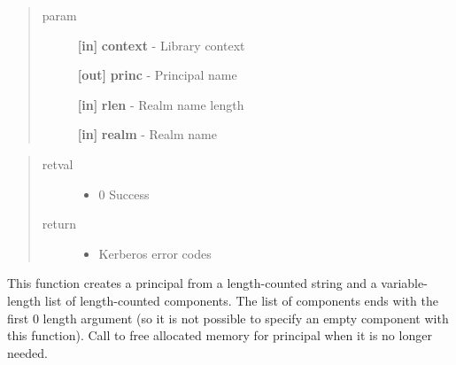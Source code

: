 \documentclass[letterpaper,10pt,english]{sphinxmanual}
\begin{document}
\begin{fulllineitems}
\label{appdev/refs/api/krb5_build_principal_ext:c.krb5_build_principal_ext}
\end{fulllineitems}

\begin{quote}\begin{description}
\item[{param}] \leavevmode
\textbf{{[}in{]}} \textbf{context} - Library context

\textbf{{[}out{]}} \textbf{princ} - Principal name

\textbf{{[}in{]}} \textbf{rlen} - Realm name length

\textbf{{[}in{]}} \textbf{realm} - Realm name

\end{description}\end{quote}
\begin{quote}\begin{description}
\item[{retval}] \leavevmode\begin{itemize}
\item {} 
0   Success

\end{itemize}

\item[{return}] \leavevmode\begin{itemize}
\item {} 
Kerberos error codes

\end{itemize}

\end{description}\end{quote}

This function creates a principal from a length-counted string and a variable-length list of length-counted components. The list of components ends with the first 0 length argument (so it is not possible to specify an empty component with this function). Call {\hyperref[appdev/refs/api/krb5_free_principal:c.krb5_free_principal]{}} to free allocated memory for principal when it is no longer needed.
\end{document}
